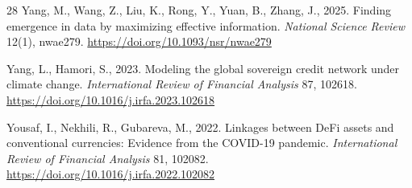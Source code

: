 \documentclass[review,12pt,authoryear]{elsarticle}
\begin{document}
\begin{thebibliography}{28}
Yang, M., Wang, Z., Liu, K., Rong, Y., Yuan, B., Zhang, J., 2025.
\newblock Finding emergence in data by maximizing effective information.
\newblock \emph{National Science Review} 12(1), nwae279. \url{https://doi.org/10.1093/nsr/nwae279}

Yang, L., Hamori, S., 2023.
\newblock Modeling the global sovereign credit network under climate change.
\newblock \emph{International Review of Financial Analysis} 87, 102618. \url{https://doi.org/10.1016/j.irfa.2023.102618}

Yousaf, I., Nekhili, R., Gubareva, M., 2022.
\newblock Linkages between DeFi assets and conventional currencies: Evidence from the COVID-19 pandemic.
\newblock \emph{International Review of Financial Analysis} 81, 102082. \url{https://doi.org/10.1016/j.irfa.2022.102082}
\end{thebibliography}
\end{document}
